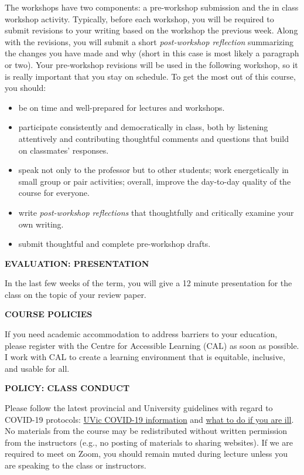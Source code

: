 \documentclass[11pt]{article}
\begin{document}
The workshops have two components: a pre-workshop submission and the in class workshop activity. Typically, before each workshop, you will be required to submit revisions to your writing based on the workshop the previous week. Along with the revisions, you will submit a short \emph{post-workshop reflection} summarizing the changes you have made and why (short in this case is most likely a paragraph or two). Your pre-workshop revisions will be used in the following workshop, so it is really important that you stay on schedule.
To get the most out of this course, you should:
\begin{itemize}
	\setlength\itemsep{0em}
	\item be on time and well-prepared for lectures and workshops.
	\item participate consistently and democratically in class, both by listening attentively
	      and contributing thoughtful comments and questions that build on classmates'
	      responses.
	\item speak not only to the professor but to other students; work energetically in small group or pair activities; overall, improve the day-to-day quality of the course for everyone.
	\item write \emph{post-workshop reflections} that thoughtfully and critically examine your own writing.
	\item submit thoughtful and complete pre-workshop drafts.
\end{itemize}

\textbf{EVALUATION: PRESENTATION} 

In the last few weeks of the term, you will give a 12 minute presentation for the class on the topic of your review paper. 

\begin{center}
  \textbf{COURSE POLICIES}
\end{center}

If you need academic accommodation to address barriers to your education, please register with the Centre for Accessible Learning (CAL) as soon as possible. I work with CAL to create a learning environment that is equitable, inclusive, and usable for all.

\textbf{POLICY: CLASS CONDUCT}

Please follow the latest provincial and University guidelines with regard to COVID-19 protocols: \href{https://www.uvic.ca/covid19/index.php}{UVic COVID-19 information} and \href{https://www.uvic.ca/covid19/health-safety/index.php#ipn-if-you-re-sick}{what to do if you are ill}. No materials from the course may be redistributed without written permission from the instructors (e.g., no posting of materials to sharing websites). If we are required to meet on Zoom, you should remain muted during lecture unless you are speaking to the class or instructors.
\end{document}
